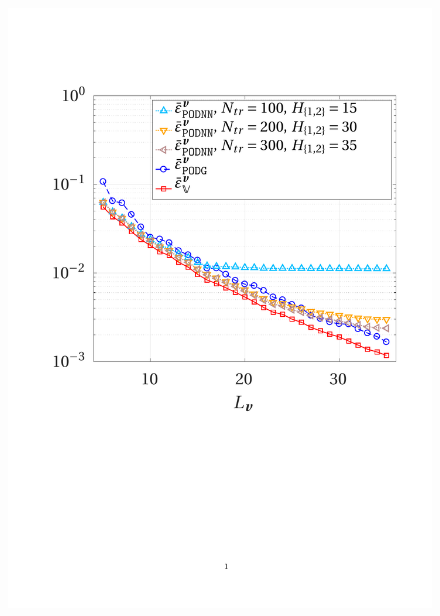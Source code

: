 \documentclass[12pt, a4paper, twoside, openright]{report}
\numberwithin{equation}{chapter}
\theoremstyle{theorem}
\theoremstyle{definition}
\theoremstyle{remark}
\theoremstyle{proposition}
\numberwithin{figure}{chapter}
\begin{document}
		\begin{figure}[H]
			\center
			\includegraphics[scale = 0.44, trim = {2cm 9cm 1.5cm 3.5cm}, clip]{dc_200_vel_error_vs_rank}

\end{figure}
\end{document}
